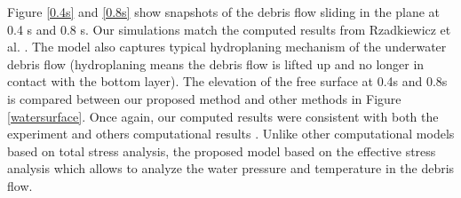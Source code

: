 \documentclass[preprint,12pt]{elsarticle}
\begin{document}
%
%
Figure \ref{0.4s} and  \ref{0.8s} show snapshots of the debris flow sliding in the plane at 0.4 s and 0.8 s. Our simulations match the computed results from Rzadkiewicz et al. \cite{Rzadkiewicz}. The model also captures typical hydroplaning mechanism of the underwater debris flow (hydroplaning means the debris flow is lifted up and no longer in contact with the bottom layer). The elevation of the free surface at 0.4s and 0.8s is compared between our proposed method and other methods in Figure \ref{watersurface}. Once again, our computed results were consistent with both the experiment and others computational results \cite{Zhang2019}. Unlike other computational models based on total stress analysis, the proposed model based on the effective stress analysis which allows to analyze the water pressure  and temperature in the debris flow.\\
%
%
\end{document}
